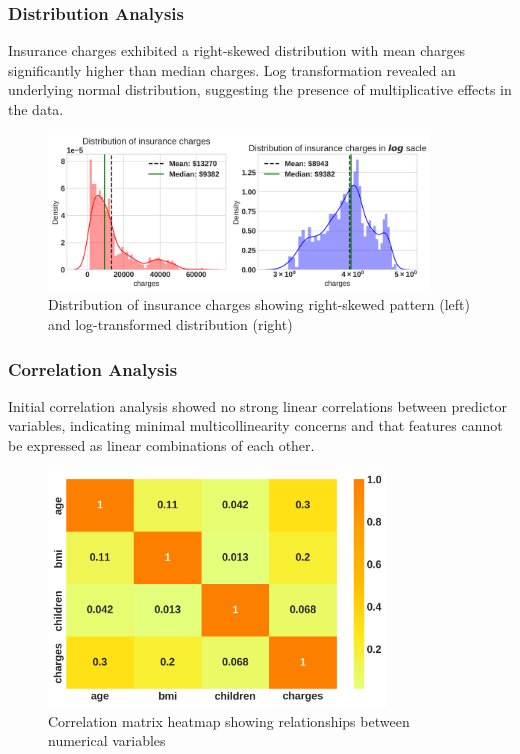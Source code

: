\documentclass[12pt,a4paper]{article}
\begin{document}
\subsubsection{Distribution Analysis}
Insurance charges exhibited a right-skewed distribution with mean charges significantly higher than median charges. Log transformation revealed an underlying normal distribution, suggesting the presence of multiplicative effects in the data.

\begin{figure}[H]
\centering
\includegraphics[width=0.9\textwidth]{charges_distribution.png}
\caption{Distribution of insurance charges showing right-skewed pattern (left) and log-transformed distribution (right)}
\label{fig:charges_distribution}
\end{figure}

\subsubsection{Correlation Analysis}
Initial correlation analysis showed no strong linear correlations between predictor variables, indicating minimal multicollinearity concerns and that features cannot be expressed as linear combinations of each other.

\begin{figure}[H]
\centering
\includegraphics[width=0.8\textwidth]{correlation_heatmap.png}
\caption{Correlation matrix heatmap showing relationships between numerical variables}
\label{fig:correlation_heatmap}
\end{figure}
\end{document}
